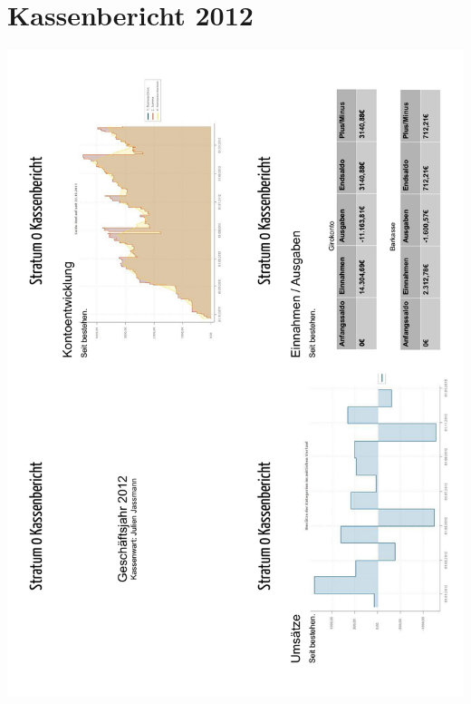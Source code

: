 \documentclass[a4paper,12pt]{scrartcl}
\begin{document}
\section{Kassenbericht 2012}
\includegraphics[width=\textwidth]{images/Kassenbericht_2012_1.pdf}
\newpage
\end{document}
